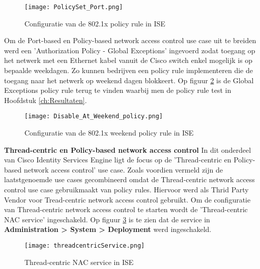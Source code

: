 	 	 \begin{figure}[H]
		\centering
		\texttt{[image: PolicySet\_Port.png]}
		\caption{Configuratie van de 802.1x policy rule in ISE}%
		\label{fig:ISESwitch}%
		\end{figure}
	
	Om de Port-based en Policy-based network access control use case uit te breiden werd een 'Authorization Policy - Global Exceptions' ingevoerd zodat toegang op het netwerk met een Ethernet kabel vanuit de Cisco switch enkel mogelijk is op bepaalde weekdagen. Zo kunnen bedrijven een policy rule implementeren die de toegang naar het netwerk op weekend dagen blokkeert. Op figuur \ref{fig:weekend} is de Global Exceptions policy rule terug te vinden waarbij men de policy rule test in Hoofdstuk \ref{ch:Resultaten}. 
	
	\begin{figure}[H]
		\centering
		\texttt{[image: Disable\_At\_Weekend\_policy.png]}
		\caption{Configuratie van de 802.1x weekend policy rule in ISE}%
		\label{fig:weekend}%
	\end{figure}
\setlength{\parindent}{5ex}\fontsize{12}{20}\textbf{Thread-centric en Policy-based network access control }
 \newline
 \newline
 In dit onderdeel van Cisco Identity Services Engine ligt de focus op de 'Thread-centric en Policy-based network access control' use case. Zoals voordien vermeld zijn de laatstgenoemde use cases gecombineerd omdat de Thread-centric network access control use case gebruikmaakt van policy rules. Hiervoor werd \cite{Rapid7_nexpose} als Thrid Party Vendor voor Tread-centric network access control gebruikt.
 \newline
 \newline
 Om de configuratie van Thread-centric network access control te starten wordt de 'Thread-centric NAC service' ingeschakeld. Op figuur \ref{fig:serviceThread} is te zien dat de service in \textbf{Administration > System > Deployment} werd ingeschakeld.
 
\begin{figure}[H]
		 	\centering
		 	\texttt{[image: threadcentricService.png]}
		 	\caption{Thread-centric NAC service in ISE}%
		 	\label{fig:serviceThread}%
\end{figure}

